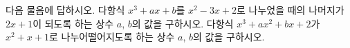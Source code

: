 다음 물음에 답하시오.
 다항식 $x^3+ax+b$를 $x^2-3x+2$로 나누었을 때의 나머지가 $2x+1$이 되도록 하는 상수 $a$, $b$의 값을 구하시오.
 다항식 $x^3+ax^2+bx+2$가 $x^2+x+1$로 나누어떨어지도록 하는 상수 $a$, $b$의 값을 구하시오.
